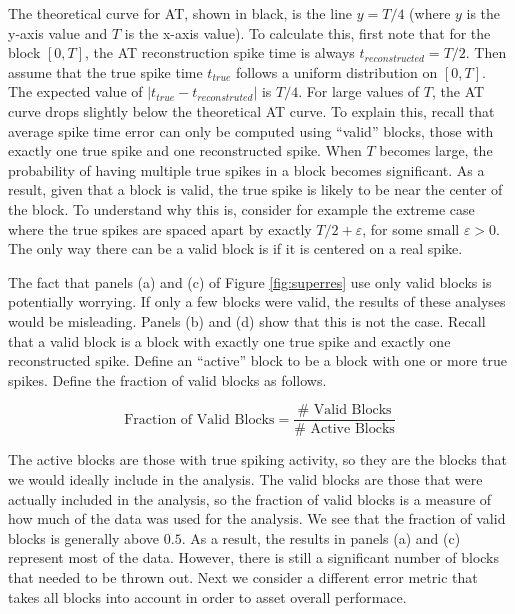 \documentclass[journal]{IEEEtran}
\begin{document}
The theoretical curve for AT, shown in black, is the line $y = T/4$ (where $y$ is the y-axis value and $T$ is the x-axis value). To calculate this, first note that for the block $[0,T]$, the AT reconstruction spike time is always $t_{reconstructed} = T/2$. Then assume that the true spike time $t_{true}$ follows a uniform distribution on $[0,T]$. The expected value of \mbox{$|t_{true} - t_{reconstruted}|$} is $T/4$. For large values of $T$, the AT curve drops slightly below the theoretical AT curve. To explain this, recall that average spike time error can only be computed using ``valid'' blocks, those with exactly one true spike and one reconstructed spike. When $T$ becomes large, the probability of having multiple true spikes in a block becomes significant. As a result, given that a block is valid, the true spike is likely to be near the center of the block. To understand why this is, consider for example the extreme case where the true spikes are spaced apart by exactly $T/2 + \varepsilon$, for some small $\varepsilon > 0$. The only way there can be a valid block is if it is centered on a real spike.

The fact that panels (a) and (c) of Figure \ref{fig:superres} use only valid blocks is potentially worrying. If only a few blocks were valid, the results of these analyses would be misleading. Panels (b) and (d) show that this is not the case. Recall that a valid block is a block with exactly one true spike and exactly one reconstructed spike. Define an ``active'' block to be a block with one or more true spikes. Define the fraction of valid blocks as follows.

\begin{equation}
\label{eq:valid}
\mathrm{Fraction\,\,of\,\,Valid\,\,Blocks} = \frac{\mathrm{\#\,\,Valid\,\,Blocks}}{\mathrm{\#\,\,Active\,\,Blocks}}
\end{equation}

The active blocks are those with true spiking activity, so they are the blocks that we would ideally include in the analysis. The valid blocks are those that were actually included in the analysis, so the fraction of valid blocks is a measure of how much of the data was used for the analysis. We see that the fraction of valid blocks is generally above $0.5$. As a result, the results in panels (a) and (c) represent most of the data. However, there is still a significant number of blocks that needed to be thrown out. Next we consider a different error metric that takes all blocks into account in order to asset overall performace.
\end{document}
